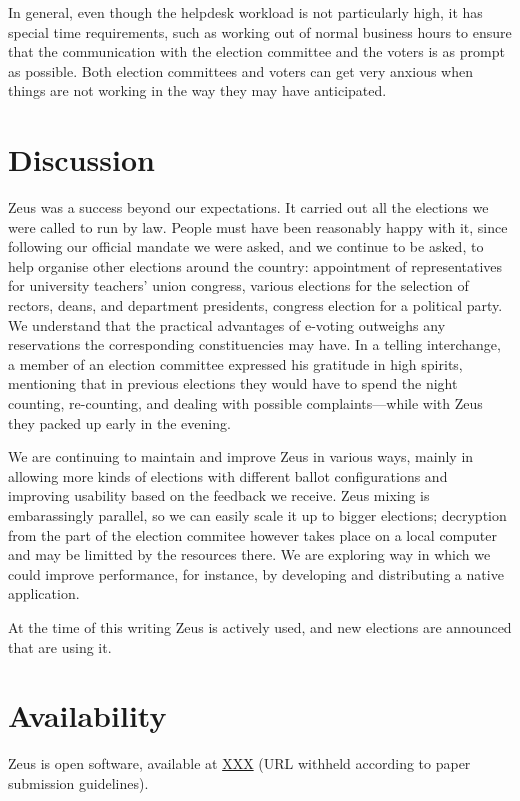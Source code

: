 \documentclass[letterpaper,10pt]{article}
\begin{document}
In general, even though the helpdesk workload is not particularly
high, it has special time requirements, such as working out of normal
business hours to ensure that the communication with the election
committee and the voters is as prompt as possible. Both election
committees and voters can get very anxious when things are not working
in the way they may have anticipated.



\section{Discussion}

Zeus was a success beyond our expectations. It carried out all the
elections we were called to run by law. People must have been
reasonably happy with it, since following our official mandate we were
asked, and we continue to be asked, to help organise other elections
around the country: appointment of representatives for university
teachers' union congress, various elections for the selection of
rectors, deans, and department presidents, congress election for a
political party. We understand that the practical advantages of
e-voting outweighs any reservations the corresponding constituencies
may have. In a telling interchange, a member of an election committee
expressed his gratitude in high spirits, mentioning that in previous
elections they would have to spend the night counting, re-counting,
and dealing with possible complaints---while with Zeus they packed up
early in the evening.

We are continuing to maintain and improve Zeus in various ways, mainly
in allowing more kinds of elections with different ballot
configurations and improving usability based on the feedback we
receive. Zeus mixing is embarassingly parallel, so we can easily scale
it up to bigger elections; decryption from the part of the election
commitee however takes place on a local computer and may be limitted
by the resources there. We are exploring way in which we could improve
performance, for instance, by developing and distributing a native
application.

At the time of this writing Zeus is actively used, and new elections
are announced that are using it. 

\section{Availability}

Zeus is open software, available at \url{XXX} (URL withheld according
to paper submission guidelines).

{\footnotesize


}
\end{document}
